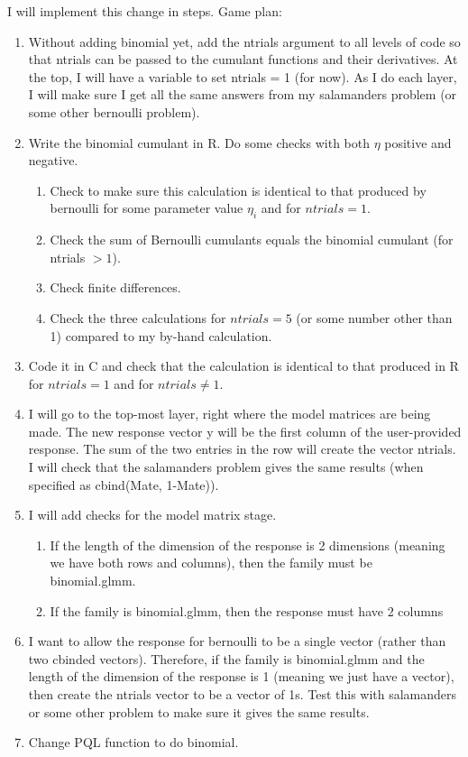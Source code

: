 \documentclass{article}
\begin{document}
I will implement this change in steps. Game plan:
\begin{enumerate}
\item Without adding binomial yet, add the ntrials argument to all levels of code so that ntrials can be passed to the cumulant functions and their derivatives. At the top, I will have a variable to set ntrials = 1 (for now). As I do each layer, I will make sure I get all the same answers from my salamanders problem (or some other bernoulli problem).
\item Write the binomial cumulant in R. Do some checks with  both $\eta$ positive and negative.
\begin{enumerate}
 \item Check to make sure this calculation is identical to that produced by bernoulli for some parameter value $\eta_i$ and for $ntrials=1$. 
\item Check  the sum of Bernoulli cumulants equals the binomial cumulant (for ntrials $>1$). 
\item Check finite differences. 
\item Check the three calculations for $ntrials=5$ (or some number other than 1) compared to my by-hand calculation. 
\end{enumerate}
\item Code it in C and check that the calculation is identical to that produced in R for $ntrials=1$ and for $ntrials \neq 1$.
\item I will go to the top-most layer, right where the model matrices are being made. The new response vector y will be the first column of the user-provided response. The sum of the two entries in the row will create the vector ntrials. I will check that the salamanders problem gives the same results (when specified as cbind(Mate, 1-Mate)).

\item I will add checks for the model matrix stage. 
\begin{enumerate}
\item  If  the length of the dimension of the response is 2 dimensions (meaning we have both rows and columns), then the family must be binomial.glmm.
\item If the family is binomial.glmm, then the response must have 2 columns
\end{enumerate}
\item I want to allow the response for bernoulli to be a single vector  (rather than two cbinded vectors). Therefore, if the family is binomial.glmm and the length of the dimension of the response is 1 (meaning we just have a vector), then create the ntrials vector to be a vector of 1s. Test this with salamanders or some other problem to make sure it gives the same results.
\item Change PQL function to do binomial.
\end{enumerate}
\end{document}
